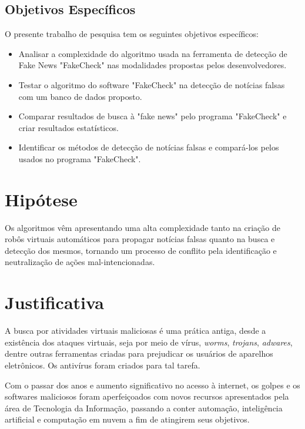 \section {Objetivos Específicos}

O presente trabalho de pesquisa tem os seguintes objetivos específicos:

\begin{itemize}
	\item Analisar a complexidade do algoritmo usada na ferramenta de detecção de Fake News "FakeCheck" nas modalidades propostas pelos desenvolvedores.
	\item Testar o algoritmo do software "FakeCheck" na detecção de notícias falsas com um banco de dados proposto.
	\item Comparar resultados de busca à "fake news" pelo programa "FakeCheck" e criar resultados estatísticos.
	\item Identificar os métodos de detecção de notícias falsas e compará-los pelos usados no programa "FakeCheck".
	 
\end{itemize}

\chapter {Hipótese}

Os algoritmos vêm apresentando uma alta complexidade tanto na criação de robôs virtuais automáticos para propagar notícias falsas quanto na busca e detecção dos mesmos, tornando um processo de conflito pela identificação e neutralização de ações mal-intencionadas.

\chapter {Justificativa}

A busca por atividades virtuais maliciosas é uma prática antiga, desde a existência dos ataques virtuais, seja por meio de vírus, \textit{worms}, \textit{trojans}, \textit{adwares}, dentre outras ferramentas criadas para prejudicar os usuários de aparelhos eletrônicos. Os antivírus foram criados para tal tarefa.

Com o passar dos anos e aumento significativo no acesso à internet, os golpes e os softwares maliciosos foram aperfeiçoados com novos recursos apresentados pela área de Tecnologia da Informação, passando a conter automação, inteligência artificial e computação em nuvem a fim de atingirem seus objetivos.

